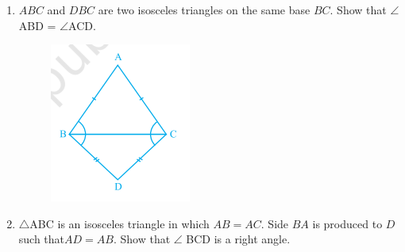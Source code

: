 \documentclass[12pt]{article}
\begin{document}
\begin{enumerate}
\item $ABC$ and $DBC$ are two isosceles triangles on the same base $BC$. Show that
$\angle$ABD = $\angle$ACD.
\begin{figure}[!h]
\begin{center}
\includegraphics[width=\columnwidth]{exemplar/9.7.2/figs/triangle6.png}
\end{center}                                      \caption{}                                        \label{fig:exemplar/9.7.2/Fig3}                                  \end{figure}
\item$\triangle$ABC is an isosceles triangle in which $AB = AC$. Side $BA $ is produced to $D$ such that$ AD = AB$. Show that $\angle$ BCD is a right angle.
	\begin{figure}[!h]
\begin{center}

\end{center}
\end{figure}
\end{enumerate}
\end{document}
